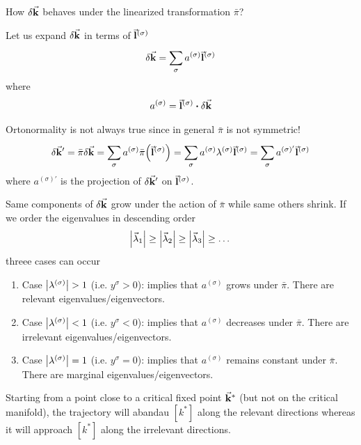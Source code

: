 \documentclass[../main/main.tex]{subfiles}
\begin{document}
How \( \delta \va{k} \) behaves under the linearized transformation \( \bar{\pi }  \)?

Let us expand \( \delta \va{k} \) in terms of \( \va{l}^{(\sigma )} \)
\begin{equation}
  \delta \va{k} = \sum_{\sigma }^{} a^{(\sigma )} \va{l}^{(\sigma )}
\end{equation}
where
\begin{equation}
  a^{(\sigma )} = \va{l}^{(\sigma )} \vdot \delta \va{k}
\end{equation}
\begin{remark}
Ortonormality is not always true since in general \( \bar{\pi }  \) is not symmetric!
\begin{equation}
  \delta \va{k}' = \bar{\pi } \delta \va{k} = \sum_{\sigma }^{} a^{(\sigma )} \bar{\pi } \qty(\va{l}^{(\sigma )})
  = \sum_{\sigma }^{} a^{(\sigma )} \lambda ^{(\sigma )} \va{l}^{(\sigma )}
  = \sum_{\sigma }^{} a^{(\sigma )'} \va{l}^{(\sigma )}
\end{equation}
where \( a^{(\sigma )'} \) is the projection of \( \delta \va{k}' \) on \( \va{l}^{(\sigma )} \).
  \end{remark}
Same components of \( \delta \va{k} \) grow under the action of \( \bar{\pi }  \) while same others shrink.
If we order the eigenvalues in descending order
\begin{equation}
  \abs{\va{\lambda }_1} \ge \abs{\va{\lambda }_2} \ge \abs{\va{\lambda }_3} \ge \dots
\end{equation}
threee cases can occur
\begin{enumerate}
\item Case \( \abs{\lambda ^{(\sigma )}} > 1 \) (i.e. \( y^\sigma > 0\)): implies that \( a^{(\sigma )} \) grows under \( \bar{\pi }  \). There are relevant eigenvalues/eigenvectors.

\item Case \( \abs{\lambda ^{(\sigma )}} < 1 \) (i.e. \( y^\sigma < 0\)): implies that \( a^{(\sigma )} \) decreases under \( \bar{\pi }  \). There are irrelevant eigenvalues/eigenvectors.

\item Case \( \abs{\lambda ^{(\sigma )}} = 1 \) (i.e. \( y^\sigma =  0\)): implies that \( a^{(\sigma )} \) remains constant under \( \bar{\pi }  \). There are marginal eigenvalues/eigenvectors.
\end{enumerate}

Starting from a point close to a critical fixed point \( \va{k}^* \) (but not on the critical manifold), the trajectory will abandau \( [k^*] \) along the relevant directions whereas it will approach \( [k^*] \) along the irrelevant directions.
\end{document}
